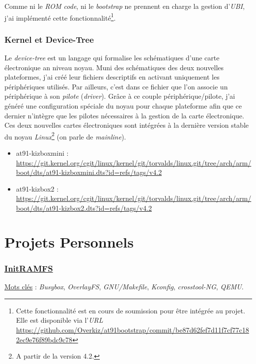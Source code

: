 \documentclass[a4paper]{article}
\begin{document}
Comme ni le \textit{ROM code}, ni le \textit{bootstrap} ne prennent en charge la gestion d'\textit{UBI}, j'ai implémenté cette fonctionnalité\footnote{Cette fonctionnalité est en cours de soumission pour être intégrée au projet. Elle est disponible via l'\textit{URL} \url{https://github.com/Overkiz/at91bootstrap/commit/be87d62fef7d11f7cf77c182ec9e76f89bdc9c78}}.

\section{Kernel et Device-Tree}

Le \textit{device-tree} est un langage qui formalise les schématiques d'une carte électronique an niveau noyau. Muni des schématiques des deux nouvelles plateformes, j'ai créé leur fichiers descriptifs en activant uniquement les périphériques utilisés. Par ailleurs, c'est dans ce fichier que l'on associe un périphérique à son \textit{pilote} (\textit{driver}). Grâce à ce couple périphérique/pilote, j'ai généré une configuration spéciale du noyau pour chaque plateforme afin que ce dernier n’intègre que les pilotes nécessaires à la gestion de la carte électronique.\\

Ces deux nouvelles cartes électroniques sont intégrées à la dernière version stable du noyau \textit{Linux}\footnote{A partir de la version 4.2.} (on parle de \textit{mainline}).
\begin{itemize}
\item at91-kizboxmini : \url{https://git.kernel.org/cgit/linux/kernel/git/torvalds/linux.git/tree/arch/arm/boot/dts/at91-kizboxmini.dts?id=refs/tags/v4.2}
\item at91-kizbox2 : \url{https://git.kernel.org/cgit/linux/kernel/git/torvalds/linux.git/tree/arch/arm/boot/dts/at91-kizbox2.dts?id=refs/tags/v4.2}
\end{itemize}
\clearpage

\part{Projets Personnels}

\section{\href{https://github.com/gazoo74/initramfs/}{InitRAMFS}}

\underline{Mots clés} : \textit{Busybox}, \textit{OverlayFS}, \textit{GNU/Makefile}, \textit{Kconfig}, \textit{crosstool-NG}, \textit{QEMU}.\\
\end{document}

